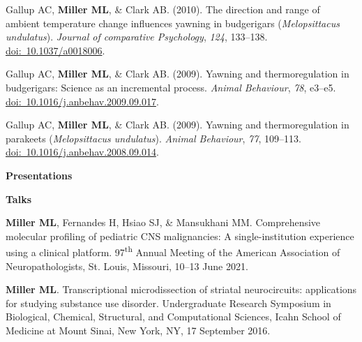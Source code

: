 \documentclass[10pt]{article}
\begin{document}
\begin{description}
\item Gallup AC, \textbf{Miller ML}, \& Clark AB. (2010). The direction and range of ambient temperature change influences yawning in budgerigars (\textit{Melopsittacus undulatus}). \textit{Journal of comparative Psychology}, \textit{124}, 133--138. \href{https://doi.org/10.1037/a0018006}{doi:~10.1037/a0018006}.
\item Gallup AC, \textbf{Miller ML}, \& Clark AB. (2009). Yawning and thermoregulation in budgerigars: Science as an incremental process. \textit{Animal Behaviour}, \textit{78}, e3--e5. \href{https://doi.org/10.1016/j.anbehav.2009.09.017}{doi:~10.1016/j.anbehav.2009.09.017}.
\item Gallup AC, \textbf{Miller ML}, \& Clark AB. (2009). Yawning and thermoregulation in parakeets (\textit{Melopsittacus undulatus}). \textit{Animal Behaviour}, \textit{77}, 109--113. \href{https://doi.org/10.1016/j.anbehav.2008.09.014}{doi:~10.1016/j.anbehav.2008.09.014}.
\end{description}

\vspace{0.1in}

{\large \textbf{Presentations}}
\begin{description}
\item \textbf{Talks}
\item[\quad] \textbf{Miller ML}, Fernandes H, Hsiao SJ, \& Mansukhani MM. Comprehensive molecular profiling of pediatric CNS malignancies: A single-institution experience using a clinical platform. 97\textsuperscript{th} Annual Meeting of the American Association of Neuropathologists, St. Louis, Missouri, 10--13 June 2021.
\item[\quad] \textbf{Miller ML}. Transcriptional microdissection of striatal neurocircuits: applications for studying substance use disorder. Undergraduate Research Symposium in Biological, Chemical, Structural, and Computational Sciences, Icahn School of Medicine at Mount Sinai, New York, NY, 17 September 2016.
\end{description}
\end{document}
